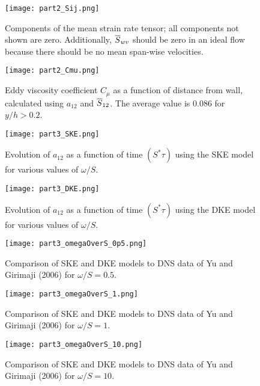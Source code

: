 \documentclass[11pt]{article}
\begin{document}
\begin{figure}[p]
\centering
\texttt{[image: part2\_Sij.png]}
\vspace{6pt}
\caption{Components of the mean strain rate tensor; all components not shown are zero. Additionally, $\overline{S}_{wv}$ should be zero in an ideal flow because there should be no mean span-wise velocities.}
\label{fig:part2_Sij}
\end{figure}

\begin{figure}[p]
\centering
\texttt{[image: part2\_Cmu.png]}
\vspace{6pt}
\caption{Eddy viscosity coefficient $C_\mu$ as a function of distance from wall, calculated using $a_{12}$ and $\overline{S}_{12}$. The average value is 0.086 for $y/h > 0.2$.}
\label{fig:part2_Cmu}
\end{figure}

\begin{figure}[p]
\centering
\texttt{[image: part3\_SKE.png]}
\vspace{6pt}
\caption{Evolution of $a_{12}$ as a function of time $(S^* \tau)$ using the SKE model for various values of $\omega/S$.}
\label{fig:part3_SKE}
\end{figure}

\begin{figure}[p]
\centering
\texttt{[image: part3\_DKE.png]}
\vspace{6pt}
\caption{Evolution of $a_{12}$ as a function of time $(S^* \tau)$ using the DKE model for various values of $\omega/S$.}
\label{fig:part3_DKE}
\end{figure}

\begin{figure}[p]
\centering
\texttt{[image: part3\_omegaOverS\_0p5.png]}
\vspace{6pt}
\caption{Comparison of SKE and DKE models to DNS data of Yu and Girimaji (2006) for $\omega/S=0.5$.}
\label{fig:part3_omegaOverS_0p5}
\end{figure}

\begin{figure}[p]
\centering
\texttt{[image: part3\_omegaOverS\_1.png]}
\vspace{6pt}
\caption{Comparison of SKE and DKE models to DNS data of Yu and Girimaji (2006) for $\omega/S=1$.}
\label{fig:part3_omegaOverS_1}
\end{figure}

\begin{figure}[p]
\centering
\texttt{[image: part3\_omegaOverS\_10.png]}
\vspace{6pt}
\caption{Comparison of SKE and DKE models to DNS data of Yu and Girimaji (2006) for $\omega/S=10$.}
\label{fig:part3_omegaOverS_10}
\end{figure}
\end{document}
